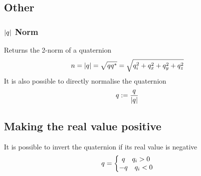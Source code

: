 \subsection{Other}
\subsubsection*{$|{q_{}}|$ Norm}
Returns the 2-norm of a quaternion
\begin{equation}
n = |{q_{}}| = \sqrt{q_{}q_{}^*} = \sqrt{q_{i}^2 + q_{x}^2 + q_{y}^2 + q_{z}^2}
\end{equation}
It is also possible to directly normalise the quaternion
\begin{equation}
q_{} := \frac{q_{}}{|{q_{}}|}
\end{equation}

\subsection*{Making the real value positive}
It is possible to invert the quaternion if its real value is negative
\begin{equation}
q_{} = \left\lbrace \begin{matrix}
q_{} \quad q_{i}>0 \\
-q_{} \quad q_{i}<0
\end{matrix} \right.
\end{equation}

